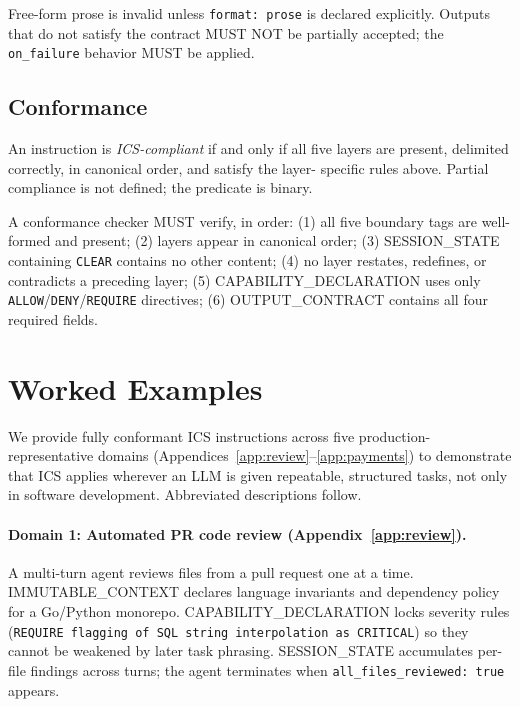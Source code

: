 \documentclass[11pt]{article}
\begin{document}
Free-form prose is invalid unless \texttt{format: prose} is declared
explicitly. Outputs that do not satisfy the contract MUST NOT be partially
accepted; the \texttt{on\_failure} behavior MUST be applied.

\subsection{Conformance}
\label{sec:conform}

An instruction is \emph{ICS-compliant} if and only if all five layers are
present, delimited correctly, in canonical order, and satisfy the layer-
specific rules above. Partial compliance is not defined; the predicate is
binary.

A conformance checker MUST verify, in order: (1) all five boundary tags are
well-formed and present; (2) layers appear in canonical order; (3) SESSION\_STATE
containing \texttt{CLEAR} contains no other content; (4) no layer restates,
redefines, or contradicts a preceding layer; (5) CAPABILITY\_DECLARATION uses
only \texttt{ALLOW}/\texttt{DENY}/\texttt{REQUIRE} directives; (6) OUTPUT\_CONTRACT
contains all four required fields.

\section{Worked Examples}
\label{sec:examples}

We provide fully conformant ICS instructions across five production-representative
domains (Appendices~\ref{app:review}--\ref{app:payments}) to demonstrate that ICS
applies wherever an LLM is given repeatable, structured tasks, not only in
software development. Abbreviated descriptions follow.

\paragraph{Domain 1: Automated PR code review (Appendix~\ref{app:review}).}
A multi-turn agent reviews files from a pull request one at a time.
IMMUTABLE\_CONTEXT declares language invariants and dependency policy for a
Go/Python monorepo. CAPABILITY\_DECLARATION locks severity rules (\texttt{REQUIRE
flagging of SQL string interpolation as CRITICAL}) so they cannot be weakened
by later task phrasing. SESSION\_STATE accumulates per-file findings across
turns; the agent terminates when \texttt{all\_files\_reviewed: true} appears.
\end{document}
